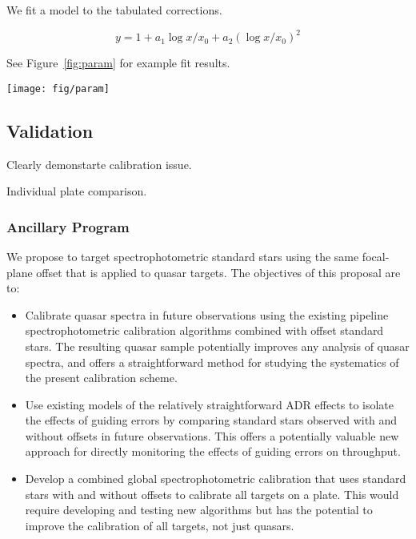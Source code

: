 \documentclass[useAMS,usenatbib]{mn2e}
\providecommand{\fig}[1]{Figure~\ref{fig:#1}}
\begin{document}
We fit a model to the tabulated corrections.

\begin{equation}
y = 1 + a_1 \log x/x_0 + a_2 (\log x/x_0)^2
\end{equation}

See \fig{param} for example fit results.

\begin{figure*}
\centering
\texttt{[image: fig/param]}
\caption{Example parametrization fit results.}
\label{fig:param}
\end{figure*}

\subsection{Validation}

Clearly demonstarte calibration issue. 

Individual plate comparison.

\subsubsection{Ancillary Program}

We propose to target spectrophotometric standard stars using the same focal-plane offset that is applied to quasar targets. The objectives of this proposal are to:

\begin{itemize}
	\item Calibrate quasar spectra in future observations using the existing pipeline spectrophotometric calibration algorithms combined with offset standard stars. The resulting quasar sample potentially improves any analysis of quasar spectra, and offers a straightforward method for studying the systematics of the present calibration scheme.
	\item Use existing models of the relatively straightforward ADR effects to isolate the effects of guiding errors by comparing standard stars observed with and without offsets in future observations. This offers a potentially valuable new approach for directly monitoring the effects of guiding errors on throughput.
	\item Develop a combined global spectrophotometric calibration that uses standard stars with and without offsets to calibrate all targets on a plate. This would require developing and testing new algorithms but has the potential to improve the calibration of all targets, not just quasars.
\end{itemize}
\end{document}
